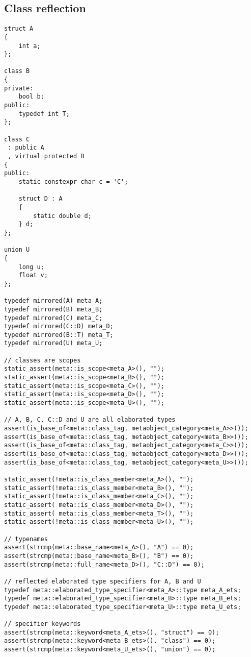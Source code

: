 \subsection{Class reflection}

\begin{verbatim}
struct A
{
	int a;
};

class B
{
private:
	bool b;
public:
	typedef int T;
};

class C
 : public A
 , virtual protected B
{
public:
	static constexpr char c = 'C';

	struct D : A
	{
		static double d;
	} d;
};

union U
{
	long u;
	float v;
};

typedef mirrored(A) meta_A;
typedef mirrored(B) meta_B;
typedef mirrored(C) meta_C;
typedef mirrored(C::D) meta_D;
typedef mirrored(B::T) meta_T;
typedef mirrored(U) meta_U;

// classes are scopes
static_assert(meta::is_scope<meta_A>(), "");
static_assert(meta::is_scope<meta_B>(), "");
static_assert(meta::is_scope<meta_C>(), "");
static_assert(meta::is_scope<meta_D>(), "");
static_assert(meta::is_scope<meta_U>(), "");

// A, B, C, C::D and U are all elaborated types
assert(is_base_of<meta::class_tag, metaobject_category<meta_A>>());
assert(is_base_of<meta::class_tag, metaobject_category<meta_B>>());
assert(is_base_of<meta::class_tag, metaobject_category<meta_C>>());
assert(is_base_of<meta::class_tag, metaobject_category<meta_D>>());
assert(is_base_of<meta::class_tag, metaobject_category<meta_U>>());

static_assert(!meta::is_class_member<meta_A>(), "");
static_assert(!meta::is_class_member<meta_B>(), "");
static_assert(!meta::is_class_member<meta_C>(), "");
static_assert( meta::is_class_member<meta_D>(), "");
static_assert( meta::is_class_member<meta_T>(), "");
static_assert(!meta::is_class_member<meta_U>(), "");

// typenames
assert(strcmp(meta::base_name<meta_A>(), "A") == 0);
assert(strcmp(meta::base_name<meta_B>(), "B") == 0);
assert(strcmp(meta::full_name<meta_D>(), "C::D") == 0);

// reflected elaborated type specifiers for A, B and U
typedef meta::elaborated_type_specifier<meta_A>::type meta_A_ets;
typedef meta::elaborated_type_specifier<meta_B>::type meta_B_ets;
typedef meta::elaborated_type_specifier<meta_U>::type meta_U_ets;

// specifier keywords
assert(strcmp(meta::keyword<meta_A_ets>(), "struct") == 0);
assert(strcmp(meta::keyword<meta_B_ets>(), "class") == 0);
assert(strcmp(meta::keyword<meta_U_ets>(), "union") == 0);


\end{verbatim}
